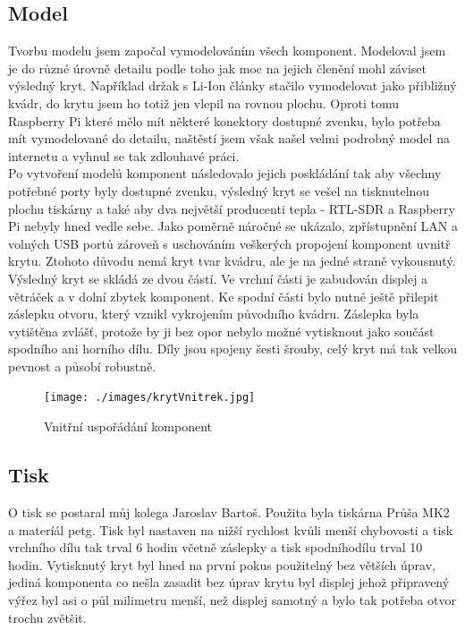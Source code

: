 \documentclass{ctuthesis}
\begin{document}
\subsection{Model}
Tvorbu modelu jsem započal vymodelováním všech komponent. Modeloval jsem je do různé úrovně detailu podle toho jak moc na jejich členění mohl záviset výsledný kryt. Například držak s Li-Ion články stačilo vymodelovat jako přibližný kvádr, do krytu jsem ho totiž jen vlepil na rovnou plochu. Oproti tomu Raspberry Pi které mělo mít některé konektory dostupné zvenku, bylo potřeba mít vymodelované do detailu, naštěstí jsem však našel velmi podrobný model na internetu a vyhnul se tak zdlouhavé práci.\\
Po vytvoření modelů komponent následovalo jejich poskládání tak aby všechny potřebné porty byly dostupné zvenku, výsledný kryt se vešel na tisknutelnou plochu tiskárny a také aby dva největší producenti tepla - RTL-SDR a Raspberry Pi nebyly hned vedle sebe. Jako poměrně náročné se ukázalo, zpřístupnění LAN a volných USB portů zároveň s uschováním veškerých propojení komponent uvnitř krytu. Ztohoto důvodu nemá kryt tvar kvádru, ale je na jedné straně vykousnutý. \\
Výsledný kryt se skládá ze dvou částí. Ve vrchní části je zabudován displej a větráček a v dolní zbytek komponent. Ke spodní části bylo nutné ještě přilepit záslepku otvoru, který vznikl vykrojením původního kvádru. Záslepka byla vytištěna zvlášť, protože by ji bez opor nebylo možné vytisknout jako součást spodního ani horního dílu. Díly jsou spojeny šesti šrouby, celý kryt má tak velkou pevnost a působí robustně.

\begin{figure}
\caption{Vnitřní uspořádání komponent}
\texttt{[image: ./images/krytVnitrek.jpg]}
\label{caseVnitrek}
\end{figure}

\subsection{Tisk}
O tisk se postaral můj kolega Jaroslav Bartoš. Použita byla tiskárna Průša MK2 a materíál petg. Tisk byl nastaven na nižší rychlost kvůli menší chybovosti a tisk vrchního dílu tak trval 6 hodin včetně záslepky a tisk spodníhodílu trval 10 hodin. Vytisknutý kryt byl hned na první pokus použitelný bez větších úprav, jediná komponenta co nešla zasadit bez úprav krytu byl displej jehož připravený výřez byl asi o půl milimetru menší, než displej samotný a bylo tak potřeba otvor trochu zvětšit.
\end{document}
